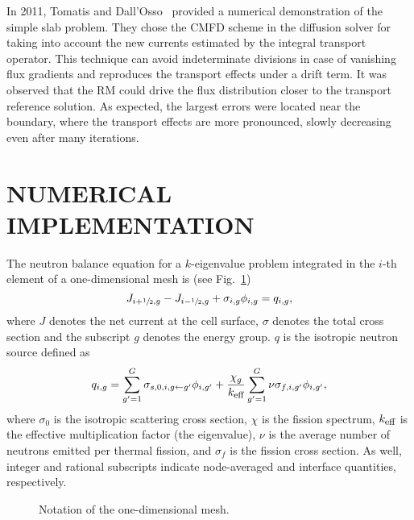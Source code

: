 \documentclass[letterpaper]{physor2020}
\newcommand{\keff}{{\ensuremath{k_{\textrm{\scriptsize{eff}}}}}}
\newcommand{\hzi}{\ensuremath{\sfrac{1}{2}}}
\begin{document}
In 2011, Tomatis and Dall'Osso~\cite{Tomatis-2011} provided a numerical demonstration of the simple slab problem. They chose the CMFD scheme in the diffusion solver for taking into account the new currents estimated by the integral transport operator.
%
%
This technique can avoid indeterminate divisions in case of vanishing flux gradients and reproduces the transport effects under a drift term. It was observed that the RM could drive the flux distribution closer to the transport reference solution. As expected, the largest errors were located near the boundary, where the transport effects are more pronounced, slowly decreasing even after many iterations.%


\section{NUMERICAL IMPLEMENTATION}
\label{sec:RM-num}

The neutron balance equation for a $k$-eigenvalue problem integrated in the $i$-th element of a one-dimensional mesh is (see Fig.~\ref{fig:mesh1D})
\begin{equation}
  \label{eq:balance}
  J_{i+\hzi,g} - J_{i-\hzi,g} + \sigma_{i,g} \phi_{i,g} = q_{i,g},
\end{equation}
where $J$ denotes the net current at the cell surface, $\sigma$ denotes the total cross section and the subscript $g$ denotes the energy group. $q$ is the isotropic neutron source defined as
\begin{equation}
  \label{eq:qsrc}
  q_{i,g} = \sum\limits_{g'=1}^G\sigma_{s,0,i,g\leftarrow g'}\phi_{i,g'} +
  \frac{\chi_g}{\keff}\sum\limits_{g'=1}^G\nu\sigma_{f,i,g'}\phi_{i,g'},
\end{equation}
where $\sigma_0$ is the isotropic scattering cross section, $\chi$ is the fission spectrum, $\keff$ is the effective multiplication factor (the eigenvalue), $\nu$ is the average number of neutrons emitted per thermal fission, and $\sigma_f$ is the fission cross section. As well, integer and rational subscripts indicate node-averaged and interface quantities, respectively.
%
\begin{figure}[htbp]
	\centering
  
	\caption{Notation of the one-dimensional mesh.}
	\label{fig:mesh1D}
\end{figure}
\end{document}
